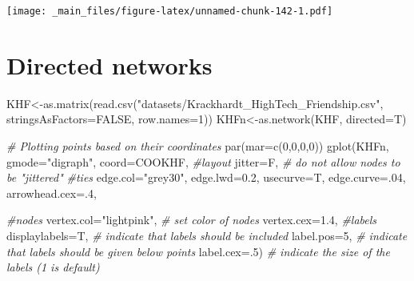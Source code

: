 \documentclass[
  notitlepage,
  onecolumn,
  openany]{book}
\newenvironment{Shaded}{\begin{snugshade}}{\end{snugshade}}
\newcommand{\AttributeTok}[1]{\textcolor[rgb]{0.77,0.63,0.00}{#1}}
\newcommand{\CommentTok}[1]{\textcolor[rgb]{0.56,0.35,0.01}{\textit{#1}}}
\newcommand{\ConstantTok}[1]{\textcolor[rgb]{0.00,0.00,0.00}{#1}}
\newcommand{\DecValTok}[1]{\textcolor[rgb]{0.00,0.00,0.81}{#1}}
\newcommand{\FloatTok}[1]{\textcolor[rgb]{0.00,0.00,0.81}{#1}}
\newcommand{\FunctionTok}[1]{\textcolor[rgb]{0.00,0.00,0.00}{#1}}
\newcommand{\NormalTok}[1]{#1}
\newcommand{\OtherTok}[1]{\textcolor[rgb]{0.56,0.35,0.01}{#1}}
\newcommand{\StringTok}[1]{\textcolor[rgb]{0.31,0.60,0.02}{#1}}
\begin{document}
\texttt{[image: \_main\_files/figure-latex/unnamed-chunk-142-1.pdf]}

\hypertarget{directed-networks}{%
\section{Directed networks}\label{directed-networks}}

\begin{Shaded}
\begin{Highlighting}[]
\NormalTok{KHF}\OtherTok{\textless{}{-}}\FunctionTok{as.matrix}\NormalTok{(}\FunctionTok{read.csv}\NormalTok{(}\StringTok{"datasets/Krackhardt\_HighTech\_Friendship.csv"}\NormalTok{,}
                        \AttributeTok{stringsAsFactors=}\ConstantTok{FALSE}\NormalTok{, }\AttributeTok{row.names=}\DecValTok{1}\NormalTok{))}
\NormalTok{KHFn}\OtherTok{\textless{}{-}}\FunctionTok{as.network}\NormalTok{(KHF, }\AttributeTok{directed=}\NormalTok{T)}
\end{Highlighting}
\end{Shaded}

\begin{Shaded}
\begin{Highlighting}[]
\CommentTok{\# Plotting points based on their coordinates}
\FunctionTok{par}\NormalTok{(}\AttributeTok{mar=}\FunctionTok{c}\NormalTok{(}\DecValTok{0}\NormalTok{,}\DecValTok{0}\NormalTok{,}\DecValTok{0}\NormalTok{,}\DecValTok{0}\NormalTok{))}
\FunctionTok{gplot}\NormalTok{(KHFn,}
      \AttributeTok{gmode=}\StringTok{"digraph"}\NormalTok{,  }
      \AttributeTok{coord=}\NormalTok{COOKHF,}
      \CommentTok{\#layout}
      \AttributeTok{jitter=}\NormalTok{F,           }\CommentTok{\# do not allow nodes to be "jittered"}
      \CommentTok{\#ties}
      \AttributeTok{edge.col=}\StringTok{"grey30"}\NormalTok{,}
      \AttributeTok{edge.lwd=}\FloatTok{0.2}\NormalTok{,}
      \AttributeTok{usecurve=}\NormalTok{T,}
      \AttributeTok{edge.curve=}\NormalTok{.}\DecValTok{04}\NormalTok{, }
      \AttributeTok{arrowhead.cex=}\NormalTok{.}\DecValTok{4}\NormalTok{,}
      
      \CommentTok{\#nodes}
      \AttributeTok{vertex.col=}\StringTok{"lightpink"}\NormalTok{,   }\CommentTok{\# set color of nodes}
      \AttributeTok{vertex.cex=}\FloatTok{1.4}\NormalTok{,}
      \CommentTok{\#labels}
      \AttributeTok{displaylabels=}\NormalTok{T,    }\CommentTok{\# indicate that labels should be included}
      \AttributeTok{label.pos=}\DecValTok{5}\NormalTok{,        }\CommentTok{\# indicate that labels should be given below points}
      \AttributeTok{label.cex=}\NormalTok{.}\DecValTok{5}\NormalTok{)       }\CommentTok{\# indicate the size of the labels (1 is default)}
\end{Highlighting}
\end{Shaded}
\end{document}

